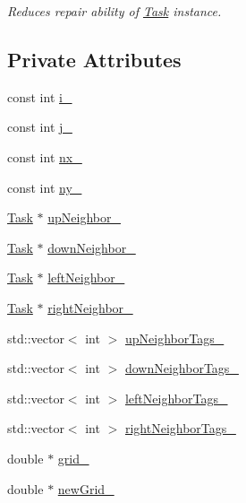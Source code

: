 \begin{DoxyCompactItemize}
\begin{DoxyCompactList}\small\item\em Reduces repair ability of \hyperlink{classTask}{Task} instance. \end{DoxyCompactList}\end{DoxyCompactItemize}
\subsection*{Private Attributes}
\begin{DoxyCompactItemize}
\item 
const int \hyperlink{classTask_aa454be94224aebece247cf0cd23fcffc}{i\+\_\+}
\item 
const int \hyperlink{classTask_aced73e768f619c3b56184befe3691aaf}{j\+\_\+}
\item 
const int \hyperlink{classTask_ad42667f57720ad0304e329e9d5b2b1f2}{nx\+\_\+}
\item 
const int \hyperlink{classTask_a786ae2a58cd74dda7142dc19649d87c5}{ny\+\_\+}
\item 
\hyperlink{classTask}{Task} $\ast$ \hyperlink{classTask_afb2ba19e810d01148e7a125e14ce755c}{up\+Neighbor\+\_\+}
\item 
\hyperlink{classTask}{Task} $\ast$ \hyperlink{classTask_a8554727d257017a90dbd0d52eaf6fe52}{down\+Neighbor\+\_\+}
\item 
\hyperlink{classTask}{Task} $\ast$ \hyperlink{classTask_a1a33c520e485401263ef144361e18dde}{left\+Neighbor\+\_\+}
\item 
\hyperlink{classTask}{Task} $\ast$ \hyperlink{classTask_aa6d859faf14ed3e950923562dba9d848}{right\+Neighbor\+\_\+}
\item 
std\+::vector$<$ int $>$ \hyperlink{classTask_ac143013d3e48eddf3aab992077c5d05a}{up\+Neighbor\+Tags\+\_\+}
\item 
std\+::vector$<$ int $>$ \hyperlink{classTask_a9c1d1cfcf9285f44029a58820ae082a4}{down\+Neighbor\+Tags\+\_\+}
\item 
std\+::vector$<$ int $>$ \hyperlink{classTask_a0968fecb0e49a48f4af6824fd513f752}{left\+Neighbor\+Tags\+\_\+}
\item 
std\+::vector$<$ int $>$ \hyperlink{classTask_a3a426a21f7ba4c4f91479207f96d6a66}{right\+Neighbor\+Tags\+\_\+}
\item 
double $\ast$ \hyperlink{classTask_ab7117d32273662d2695f80f5ea245331}{grid\+\_\+}
\item 
double $\ast$ \hyperlink{classTask_a554be6d55c1e3204cf946d9c0faf97c3}{new\+Grid\+\_\+}
\item 

\end{DoxyCompactItemize}

